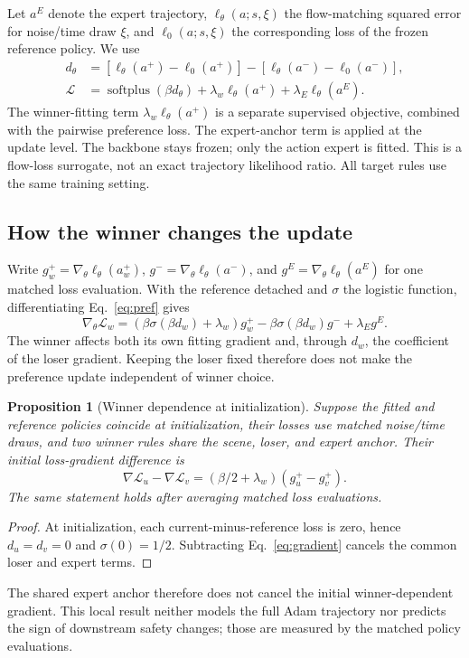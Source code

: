\documentclass[letterpaper,10pt,conference]{ieeeconf}
\newtheorem{proposition}{Proposition}
\begin{document}
Let $a^E$ denote the expert trajectory, $\ell_\theta(a;s,\xi)$ the flow-matching squared error for noise/time draw $\xi$, and $\ell_0(a;s,\xi)$ the corresponding loss of the frozen reference policy. We use
\begin{align}
d_\theta&=[\ell_\theta(a^+)-\ell_0(a^+)]-[\ell_\theta(a^-)-\ell_0(a^-)],\nonumber\\
\mathcal L&=\operatorname{softplus}(\beta d_\theta)+\lambda_w\ell_\theta(a^+)
 +\lambda_E\ell_\theta(a^E).\label{eq:pref}
\end{align}
The winner-fitting term $\lambda_w\ell_\theta(a^+)$ is a separate supervised objective, combined with the pairwise preference loss. The expert-anchor term is applied at the update level. The backbone stays frozen; only the action expert is fitted. This is a flow-loss surrogate, not an exact trajectory likelihood ratio. All target rules use the same training setting.

\subsection{How the winner changes the update}
Write $g^+_w=\nabla_\theta\ell_\theta(a^+_w)$, $g^-=\nabla_\theta\ell_\theta(a^-)$, and $g^E=\nabla_\theta\ell_\theta(a^E)$ for one matched loss evaluation. With the reference detached and $\sigma$ the logistic function, differentiating Eq.~\eqref{eq:pref} gives
\begin{equation}
\nabla_\theta\mathcal L_w
=(\beta\sigma(\beta d_w)+\lambda_w)g^+_w
-\beta\sigma(\beta d_w)g^-+\lambda_E g^E.
\label{eq:gradient}
\end{equation}
The winner affects both its own fitting gradient and, through $d_w$, the coefficient of the loser gradient. Keeping the loser fixed therefore does not make the preference update independent of winner choice.

\begin{proposition}[Winner dependence at initialization]\label{prop:update}
Suppose the fitted and reference policies coincide at initialization, their losses use matched noise/time draws, and two winner rules share the scene, loser, and expert anchor. Their initial loss-gradient difference is
\begin{equation}
\nabla\mathcal L_u-\nabla\mathcal L_v
=(\beta/2+\lambda_w)(g^+_u-g^+_v).
\label{eq:gradientdiff}
\end{equation}
The same statement holds after averaging matched loss evaluations.
\end{proposition}
\begin{proof}
At initialization, each current-minus-reference loss is zero, hence $d_u=d_v=0$ and $\sigma(0)=1/2$. Subtracting Eq.~\eqref{eq:gradient} cancels the common loser and expert terms.
\end{proof}
The shared expert anchor therefore does not cancel the initial winner-dependent gradient. This local result neither models the full Adam trajectory nor predicts the sign of downstream safety changes; those are measured by the matched policy evaluations.
\end{document}
